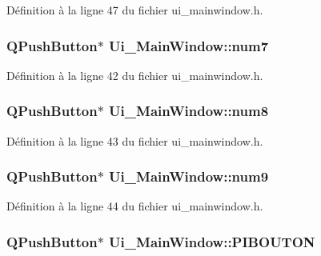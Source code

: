 \-Définition à la ligne 47 du fichier ui\-\_\-mainwindow.\-h.

\hypertarget{class_ui___main_window_a6b99070e2ed530d98b26f79ce1b5ecdf}{
\subsubsection[{num7}]{\setlength{\rightskip}{0pt plus 5cm}\-Q\-Push\-Button$\ast$ {\bf \-Ui\-\_\-\-Main\-Window\-::num7}}}\label{class_ui___main_window_a6b99070e2ed530d98b26f79ce1b5ecdf}


\-Définition à la ligne 42 du fichier ui\-\_\-mainwindow.\-h.

\hypertarget{class_ui___main_window_aeca50b654eb96a8bb380a34405c0e8a6}{
\subsubsection[{num8}]{\setlength{\rightskip}{0pt plus 5cm}\-Q\-Push\-Button$\ast$ {\bf \-Ui\-\_\-\-Main\-Window\-::num8}}}\label{class_ui___main_window_aeca50b654eb96a8bb380a34405c0e8a6}


\-Définition à la ligne 43 du fichier ui\-\_\-mainwindow.\-h.

\hypertarget{class_ui___main_window_a2a726c1956d35bdc8131b967f8a6d152}{
\subsubsection[{num9}]{\setlength{\rightskip}{0pt plus 5cm}\-Q\-Push\-Button$\ast$ {\bf \-Ui\-\_\-\-Main\-Window\-::num9}}}\label{class_ui___main_window_a2a726c1956d35bdc8131b967f8a6d152}


\-Définition à la ligne 44 du fichier ui\-\_\-mainwindow.\-h.

\hypertarget{class_ui___main_window_a10499cba7898eb6c0827b13d2b2e09e4}{
\subsubsection[{\-P\-I\-B\-O\-U\-T\-O\-N}]{\setlength{\rightskip}{0pt plus 5cm}\-Q\-Push\-Button$\ast$ {\bf \-Ui\-\_\-\-Main\-Window\-::\-P\-I\-B\-O\-U\-T\-O\-N}}}\label{class_ui___main_window_a10499cba7898eb6c0827b13d2b2e09e4}



